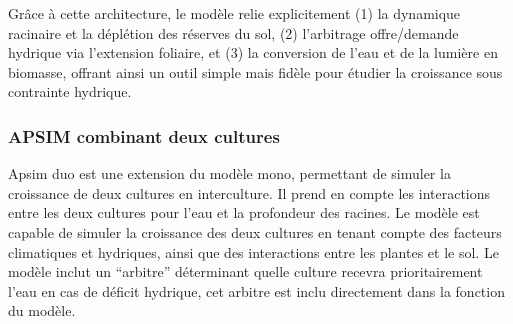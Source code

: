 \documentclass[
]{article}
\begin{document}
Grâce à cette architecture, le modèle relie explicitement (1) la
dynamique racinaire et la déplétion des réserves du sol, (2) l'arbitrage
offre/demande hydrique via l'extension foliaire, et (3) la conversion de
l'eau et de la lumière en biomasse, offrant ainsi un outil simple mais
fidèle pour étudier la croissance sous contrainte hydrique.

\subsubsection{APSIM combinant deux
cultures}\label{apsim-combinant-deux-cultures}

Apsim duo est une extension du modèle mono, permettant de simuler la
croissance de deux cultures en interculture. Il prend en compte les
interactions entre les deux cultures pour l'eau et la profondeur des
racines. Le modèle est capable de simuler la croissance des deux
cultures en tenant compte des facteurs climatiques et hydriques, ainsi
que des interactions entre les plantes et le sol. Le modèle inclut un
``arbitre'' déterminant quelle culture recevra prioritairement l'eau en
cas de déficit hydrique, cet arbitre est inclu directement dans la
fonction du modèle.\\
\end{document}
